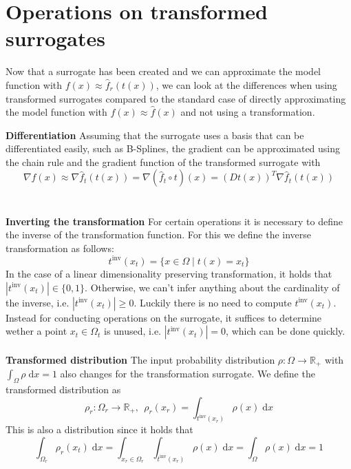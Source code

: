 \documentclass[
  a4paper,  %
  twoside,  %
  bibliography=totoc,
  headsepline,
  cleardoublepage=empty,
  parskip=half,
  draft=false
]{scrbook}
\begin{document}
\section{Operations on transformed surrogates}

Now that a surrogate has been created and we can approximate the model function with $f(x) \approx \hat{f}_r(t(x))$,
we can look at the differences when using transformed surrogates compared to the standard case of directly approximating the model function with $f(x) \approx \hat{f}(x)$ and not using a transformation.

\textbf{Differentiation }
Assuming that the surrogate uses a basis that can be differentiated easily, such as B-Splines, the gradient can be approximated using the chain rule and the gradient function of the transformed surrogate with
\begin{equation}
\nabla f(x) \approx \nabla \hat{f}_t(t(x)) = \nabla (\hat{f}_t \circ t)(x)=(Dt(x))^T \nabla \hat{f}_t(t(x))
\end{equation}
\\
\\
\textbf{Inverting the transformation  }
For certain operations it is necessary to define the inverse of the transformation function.
For this we define the inverse transformation as follows:
\begin{equation}
t^{\text{inv}}(x_{t})=\{x \in \Omega \mid t(x)=x_{t}\}
\end{equation}
In the case of a linear dimensionality preserving transformation, it holds that $|t^{\text{inv}}(x_{t})| \in \{0,1\}$.
Otherwise, we can't infer anything about the cardinality of the inverse, i.e. $|t^{\text{inv}}(x_{t})| \geq 0$.
Luckily there is no need to compute $t^{\text{inv}}(x_{t})$. Instead for conducting operations on the surrogate, it suffices to determine wether a point $x_t \in \Omega_t$ is unused, i.e. $|t^{\text{inv}}(x_{t})| = 0$, which can be done quickly.
\\
\\
\textbf{Transformed distribution}
The input probability distribution $\rho \colon \Omega \to \mathds{R_+}$ with $\int_{\Omega} \rho \; \text{d}x = 1$ also changes for the transformation surrogate.
We define the transformed distribution as
\begin{equation}
\rho_r \colon \Omega_r \to \mathds{R_+}, ~~ \rho_r(x_r)=\int_{t^{\text{inv}}(x_r)} \rho(x) \; \text{d}x 
\end{equation}
This is also a distribution since it holds that
\begin{equation}
\int_{\Omega_r} \rho_r(x_t) \; \text{d}x=\int_{x_r \in \Omega_r} \int_{t^{\text{inv}}(x_r)} \rho(x) \; \text{d}x = \int_{\Omega} \rho(x) \; \text{d}x = 1
\end{equation}
\end{document}
